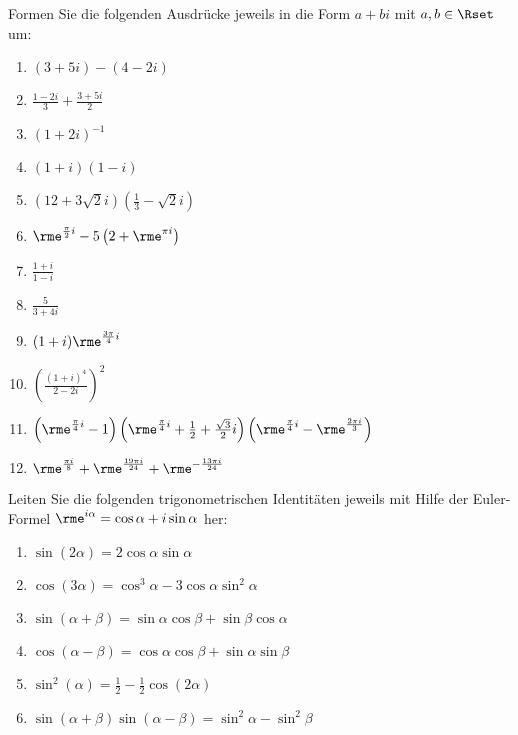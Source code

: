 Formen Sie die folgenden Ausdrücke jeweils in die Form $a+bi$ mit $a,b\in\Rset$ um:\\
\parbox{0.4\textwidth}{\begin{enumerate}
\item $(3+5i)-(4-2i)$
\item $\frac{1-2i}{3}+\frac{3+5i}{2}$
\item $(1+2i)^{-1}$
\item $(1+i)(1-i)$
\item $(12+3\sqrt{2}i)\left(\frac{1}{3}-\sqrt{2}i\right)$
\item $\rme^{\frac{\pi}{2}i}-5\left(2+\rme^{\pi i}\right)$
\item $\frac{1+i}{1-i}$
\end{enumerate}}\parbox{0.6\textwidth}{\begin{enumerate}\setcounter{enumi}{7}
\item $\frac{5}{3+4i}$
\item $(1+i)\rme^{\frac{3\pi}{4}i}$
\item $\left(\frac{(1+i)^4}{2-2i}\right)^2$
\item $\left(\rme^{\frac{\pi}{4}i}-1\right)\left(\rme^{\frac{\pi}{4}i}+\frac{1}{2}+\frac{\sqrt{3}}{2}i\right)\left(\rme^{\frac{\pi}{4}i}-\rme^{\frac{2\pi i}{3}}\right)$
\item $\rme^{\frac{\pi i}{8}}+\rme^{\frac{19\pi i}{24}}+\rme^{-\frac{13\pi i}{24}}$
\end{enumerate}}




Leiten Sie die folgenden trigonometrischen Identitäten jeweils mit Hilfe der Euler-Formel $\rme^{i\alpha}=\cos\alpha+i\sin\alpha$ her:\\
\parbox{0.5\textwidth}{\begin{enumerate}
\item $\sin(2\alpha)=2\cos\alpha\sin\alpha$
\item $\cos(3\alpha)=\cos^3\alpha-3\cos\alpha\sin^2\alpha$
\item $\sin(\alpha+\beta)=\sin\alpha\cos\beta+\sin\beta\cos\alpha$
\end{enumerate}}\parbox{0.5\textwidth}{\begin{enumerate}\setcounter{enumi}{3}
\item $\cos(\alpha-\beta)=\cos\alpha\cos\beta+\sin\alpha\sin\beta$
\item $\sin^2(\alpha)=\frac{1}{2}-\frac{1}{2}\cos(2\alpha)$
\item $\sin(\alpha+\beta)\sin(\alpha-\beta)=\sin^2\alpha-\sin^2\beta$
\end{enumerate}}



